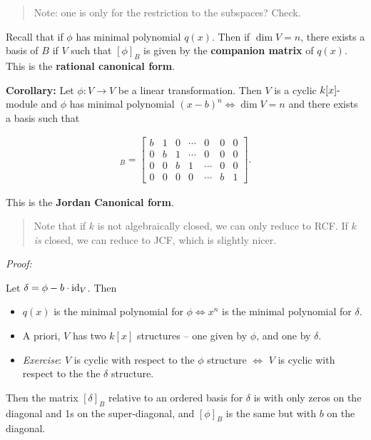 \begin{quote}
Note: one is only for the restriction to the subspaces? Check.
\end{quote}

Recall that if \(\phi\) has minimal polynomial \(q(x)\). Then if
\(\dim V = n\), there exists a basis of \(B\) if \(V\) such that
\([\phi]_B\) is given by the \textbf{companion matrix} of \(q(x)\). This
is the \textbf{rational canonical form}.

\textbf{Corollary:} Let \(\phi: V\to V\) be a linear transformation.
Then \(V\) is a cyclic \(k[x]{\hbox{-}}\)module and \(\phi\) has minimal
polynomial \((x-b)^n \iff \dim V = n\) and there exists a basis such
that

\begin{align*}
[\phi]_B = \left[\begin{array}{ccccccc}
b & 1 & 0   & \cdots  & 0       & 0 & 0\\
0 & b & 1   & \cdots  & 0       & 0 & 0\\
0 & 0 & b   & 1       &\cdots   & 0 & 0\\
0 & 0 & 0   & 0       & \cdots  & b & 1
\end{array}\right]
.\end{align*}

This is the \textbf{Jordan Canonical form}.

\begin{quote}
Note that if \(k\) is not algebraically closed, we can only reduce to
RCF. If \(k\) \emph{is} closed, we can reduce to JCF, which is slightly
nicer.
\end{quote}

\emph{Proof:}

Let \(\delta = \phi - b \cdot\text{id}_V\). Then

\begin{itemize}
\item
  \(q(x)\) is the minimal polynomial for \(\phi \iff x^n\) is the
  minimal polynomial for \(\delta\).
\item
  A priori, \(V\) has two \(k[x]\) structures -- one given by \(\phi\),
  and one by \(\delta\).
\item
  \emph{Exercise}: \(V\) is cyclic with respect to the \(\phi\)
  structure \(\iff\) \(V\) is cyclic with respect to the the \(\delta\)
  structure.
\end{itemize}

Then the matrix \([\delta]_B\) relative to an ordered basis for
\(\delta\) is with only zeros on the diagonal and 1s on the
super-diagonal, and \([\phi]_B\) is the same but with \(b\) on the
diagonal.

